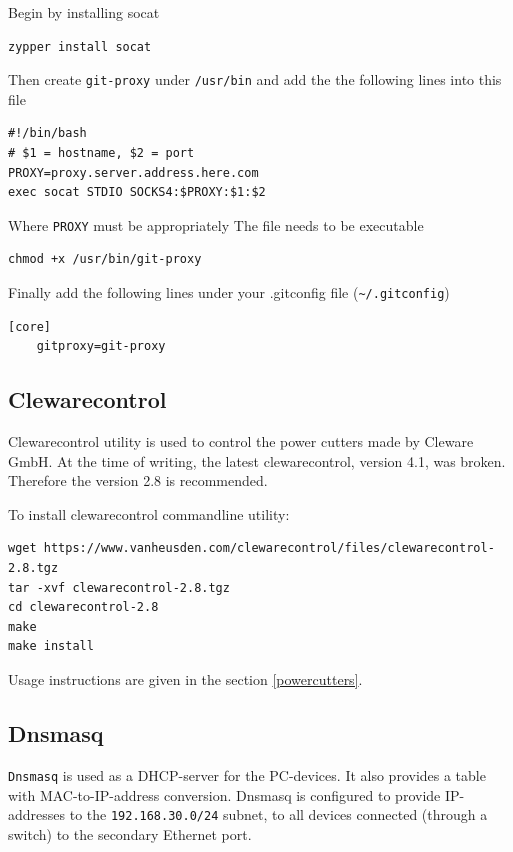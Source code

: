 \documentclass[a4paper,11pt]{article}
\newcommand{\cmd}[1]{\texttt{#1}}
\begin{document}
Begin by installing socat

\begin{lstlisting}
zypper install socat
\end{lstlisting}

Then create \cmd{git-proxy} under \cmd{/usr/bin} and add the the following lines into this file

\begin{lstlisting}
#!/bin/bash
# $1 = hostname, $2 = port
PROXY=proxy.server.address.here.com
exec socat STDIO SOCKS4:$PROXY:$1:$2
\end{lstlisting}

Where \cmd{PROXY} must be appropriately
The file needs to be executable

\begin{lstlisting}
chmod +x /usr/bin/git-proxy
\end{lstlisting}

Finally add the following lines under your .gitconfig file (\cmd{\textasciitilde/.gitconfig})

\begin{lstlisting}
[core]
	gitproxy=git-proxy
\end{lstlisting}

\subsection*{Clewarecontrol}
Clewarecontrol utility is used to control the power cutters made by Cleware GmbH. At the time of writing, the latest clewarecontrol, version 4.1, was broken. Therefore the version 2.8 is recommended.

To install clewarecontrol commandline utility:
\begin{lstlisting}
wget https://www.vanheusden.com/clewarecontrol/files/clewarecontrol-2.8.tgz
tar -xvf clewarecontrol-2.8.tgz
cd clewarecontrol-2.8
make
make install
\end{lstlisting}

Usage instructions are given in the section \ref{powercutters}.

\subsection*{Dnsmasq}
\cmd{Dnsmasq} is used as a DHCP-server for the PC-devices. It also provides a table with MAC-to-IP-address conversion. Dnsmasq is configured to provide IP-addresses to the \cmd{192.168.30.0/24} subnet, to all devices connected (through a switch) to the secondary Ethernet port.
\end{document}
